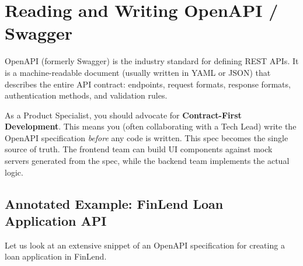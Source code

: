 \documentclass[
  11pt,
  openany,
  oneside]{book}
\begin{document}
\section{Reading and Writing OpenAPI /
Swagger}\label{reading-and-writing-openapi-swagger}

OpenAPI (formerly Swagger) is the industry standard for defining REST
APIs. It is a machine-readable document (usually written in YAML or
JSON) that describes the entire API contract: endpoints, request
formats, response formats, authentication methods, and validation rules.

As a Product Specialist, you should advocate for \textbf{Contract-First
Development}. This means you (often collaborating with a Tech Lead)
write the OpenAPI specification \emph{before} any code is written. This
spec becomes the single source of truth. The frontend team can build UI
components against mock servers generated from the spec, while the
backend team implements the actual logic.

\subsection{Annotated Example: FinLend Loan Application
API}\label{annotated-example-finlend-loan-application-api}

Let us look at an extensive snippet of an OpenAPI specification for
creating a loan application in FinLend.
\end{document}
